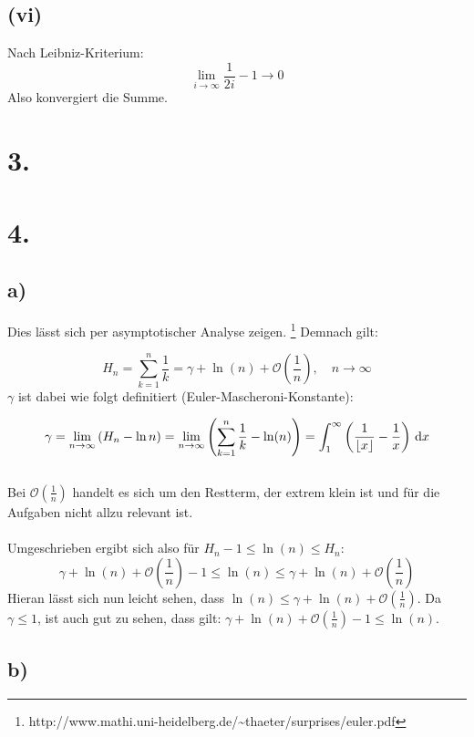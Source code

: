 \documentclass[a4paper]{scrartcl}
\begin{document}
\subsection{(vi)}
Nach Leibniz-Kriterium:
\[ \lim_{i\to\infty} \frac 1 {2i} - 1 \rightarrow 0 \]
Also konvergiert die Summe.

\section{3.}

\section{4.}
\subsection{a)}
Dies lässt sich per asymptotischer Analyse zeigen. \footnote{http://www.mathi.uni-heidelberg.de/\textasciitilde thaeter/surprises/euler.pdf}
Demnach gilt:

\[H_n=\sum_{k=1}^n \frac{1}{k} = \gamma + \ln (n) +\mathcal O\!\left(\frac 1{n}\right),\quad n\to\infty \]
%
\(\gamma\) ist dabei wie folgt definitiert (Euler-Mascheroni-Konstante):

\[ \gamma = \lim_{n\to\infty} \left(H_n - \ln n\right) = \lim_{n \rightarrow \infty } \left(\sum_{k=1}^n \frac{1}{k} - \ln(n) \right)=\int_1^\infty\left({1\over\lfloor x\rfloor}-{1\over x}\right)\,\mathrm dx \] \\
%
Bei \(\mathcal O\!\left(\frac 1{n}\right)\) handelt es sich um den Restterm, der extrem klein ist und für die Aufgaben nicht allzu relevant ist. \\ \\
%
Umgeschrieben ergibt sich also für \(H_n -1 \leq \ln (n) \leq H_n \):
\[ \gamma + \ln (n) +\mathcal O\!\left(\frac 1{n}\right) -1 \leq \ln (n) \leq \gamma + \ln (n) +\mathcal O\!\left(\frac 1{n}\right)\]
%
Hieran lässt sich nun leicht sehen, dass \( \ln (n) \leq \gamma + \ln (n) +\mathcal O\!\left(\frac 1{n}\right) \). Da \(\gamma \leq 1\), ist auch gut zu sehen, dass gilt: \( \gamma + \ln (n) +\mathcal O\!\left(\frac 1{n}\right) -1 \leq \ln (n) \).

\subsection{b)}
\end{document}
